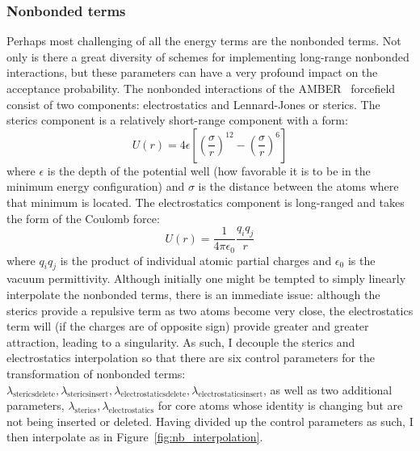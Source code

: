 \subsubsection{Nonbonded terms}
%
Perhaps most challenging of all the energy terms are the nonbonded terms. Not only is there a great diversity of schemes for implementing long-range nonbonded interactions, but these parameters can have a very profound impact on the acceptance probability.
%
The nonbonded interactions of the AMBER~\cite{Ponder2003} forcefield consist of two components: electrostatics and Lennard-Jones or sterics.
%
The sterics component is a relatively short-range component with a form:
\begin{equation}
    U(r) = 4\epsilon\left[ \left(\frac{\sigma}{r}\right)^{12} - \left(\frac{\sigma}{r}\right)^6\right]
\end{equation}
%
\noident where $\epsilon$ is the depth of the potential well (how favorable it is to be in the minimum energy configuration) and $\sigma$ is the distance between the atoms where that minimum is located.
%
The electrostatics component is long-ranged and takes the form of the Coulomb force:
%
\begin{equation}
    U(r) = \frac{1}{4\pi\epsilon_0} \frac{q_i q_j}{r}
\end{equation}
%
\noindent where $q_i q_j$ is the product of individual atomic partial charges and $\epsilon_0$ is the vacuum permittivity.
%
Although initially one might be tempted to simply linearly interpolate the nonbonded terms, there is an immediate issue: although the sterics provide a repulsive term as two atoms become very close, the electrostatics term will (if the charges are of opposite sign) provide greater and greater attraction, leading to a singularity.
%
As such, I decouple the sterics and electrostatics interpolation so that there are six control parameters for the transformation of nonbonded terms: $\lambda_\mathrm{stericsdelete}, \lambda_\mathrm{stericsinsert}, \lambda_\mathrm{electrostaticsdelete}, \lambda_\mathrm{electrostaticsinsert}$, as well as two additional parameters, $\lambda_\mathrm{sterics}, \lambda_\mathrm{electrostatics}$ for core atoms whose identity is changing but are not being inserted or deleted.
%
Having divided up the control parameters as such, I then interpolate as in Figure~\ref{fig:nb_interpolation}.
%
%

